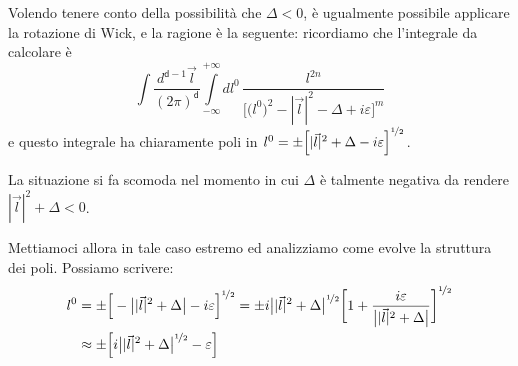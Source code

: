 \documentclass[../main.tex]{subfiles}
\begin{document}
Volendo tenere conto della possibilità che $\Delta < 0$, è ugualmente possibile applicare la rotazione di Wick, e la ragione è la seguente: ricordiamo che l'integrale da calcolare è 
\[
\int\frac{d^{\mathsf d -1}\Vec l}{(2\pi)^\mathsf d}\int\limits_{-\infty}^{+\infty}dl^0\, \frac{l^{2n}}{\Big[ \big(l^0\big)^2 - |\Vec{l}|^2 - \Delta + i\varepsilon \Big]^m}
\]
e questo integrale ha chiaramente poli in \(l^0 = \pm \Big[|\Vec{l}|^2 + \Delta - i\varepsilon\Big]^{\nicefrac{1}{2}}\).

La situazione si fa scomoda nel momento in cui $\Delta$ è talmente negativa da rendere \(|\Vec{l}|^2 + \Delta < 0\).

Mettiamoci allora in tale caso estremo ed analizziamo come evolve la struttura dei poli. Possiamo scrivere:
\begin{align*}
    l^0 
    &= \pm \Big[ -\big||\Vec{l}|^2 + \Delta\big| - i\varepsilon \Big]^{\nicefrac{1}{2}} = \pm i\big||\Vec{l}|^2 + \Delta\big|^{\nicefrac{1}{2}} \bigg[ 1 + \frac{i\varepsilon}{\big||\Vec{l}|^2 + \Delta\big|} \bigg]^{\nicefrac{1}{2}}\\
    & \approx \pm \Big[i\big||\Vec{l}|^2 + \Delta\big|^{\nicefrac{1}{2}} - \varepsilon \Big]
\end{align*}
\end{document}
